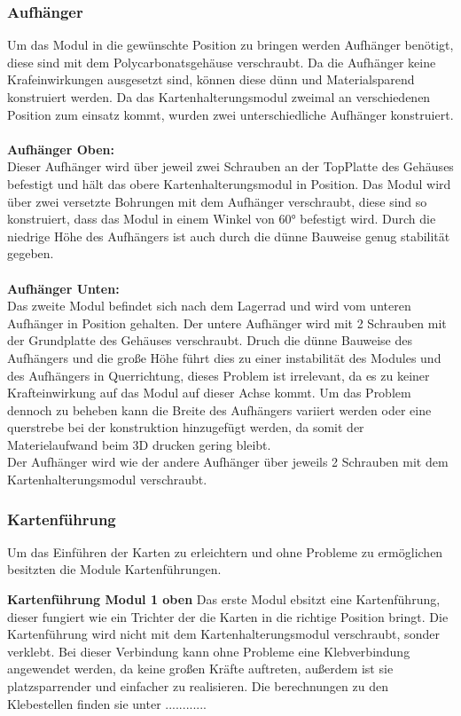 \subsubsection{Aufhänger}
Um das Modul in die gewünschte Position zu bringen werden Aufhänger benötigt, diese sind mit dem Polycarbonatsgehäuse verschraubt.
Da die Aufhänger keine Krafeinwirkungen ausgesetzt sind, können diese dünn und Materialsparend konstruiert werden.
Da das Kartenhalterungsmodul zweimal an verschiedenen Position zum einsatz kommt, wurden zwei unterschiedliche
Aufhänger konstruiert.\\\\
\textbf{Aufhänger Oben:} \\
Dieser Aufhänger wird über jeweil zwei Schrauben an der TopPlatte des Gehäuses befestigt und hält das obere Kartenhalterungsmodul in Position.
Das Modul wird über zwei versetzte Bohrungen mit dem Aufhänger verschraubt, diese sind so konstruiert, dass das Modul in einem
Winkel von 60° befestigt wird.
Durch die niedrige Höhe des Aufhängers ist auch durch die dünne Bauweise genug stabilität gegeben.\\\\
\textbf{Aufhänger Unten:}\\
Das zweite Modul befindet sich nach dem Lagerrad und wird vom unteren Aufhänger in Position gehalten. Der untere Aufhänger
wird mit 2 Schrauben mit der Grundplatte des Gehäuses verschraubt. Druch die dünne Bauweise des Aufhängers und die
große Höhe führt dies zu einer instabilität des Modules und des Aufhängers in Querrichtung, dieses Problem ist irrelevant, da es
zu keiner Krafteinwirkung auf das Modul auf dieser Achse kommt. Um das Problem dennoch zu beheben kann die Breite des
Aufhängers variiert werden oder eine querstrebe bei der konstruktion hinzugefügt werden, da somit der Materielaufwand beim 3D
drucken gering bleibt.\\
Der Aufhänger wird wie der andere Aufhänger über jeweils 2 Schrauben mit dem Kartenhalterungsmodul verschraubt.

\subsubsection{Kartenführung}
Um das Einführen der Karten zu erleichtern und ohne Probleme zu ermöglichen besitzten die Module Kartenführungen.

\textbf{Kartenführung Modul 1 oben}
Das erste Modul ebsitzt eine Kartenführung, dieser fungiert wie ein Trichter der die Karten in die richtige Position bringt.
Die Kartenführung wird nicht mit dem Kartenhalterungsmodul verschraubt, sonder
verklebt. Bei dieser Verbindung kann ohne Probleme eine Klebverbindung angewendet werden, da keine großen Kräfte auftreten, außerdem
ist sie platzsparrender und einfacher zu realisieren. Die berechnungen zu den Klebestellen finden sie unter ............

